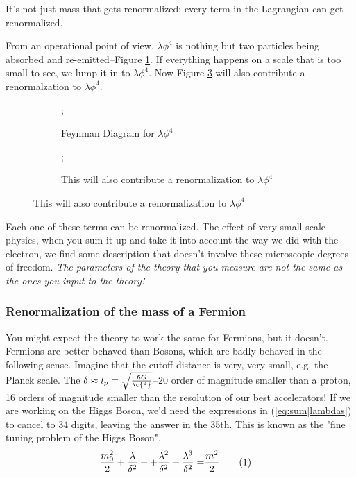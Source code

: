 \documentclass[]{article}
\newcommand\numberthis{\addtocounter{equation}{1}\tag{\theequation}}
\begin{document}
It's not just mass that gets renormalized: every term in the Lagrangian can get renormalized.

From an operational point of view, $\lambda \phi^4$ is nothing but two particles being absorbed and re-emitted--Figure \ref{fig:lambda:phi:4}. If everything happens on a scale that is too small to see, we lump it in to $\lambda \phi^4$. Now Figure \ref{fig:lambda:phi:4x} will also contribute a renormalzation to $\lambda \phi^4$.

\begin{figure}[H]
	\begin{center}
		\caption{Renormalization of $\lambda \phi^4$}
		\begin{subfigure}[t]{0.45\textwidth}
			\caption{Feynman Diagram for $\lambda \phi^4$}\label{fig:lambda:phi:4}
			;
		\end{subfigure}
		\begin{subfigure}[t]{0.45\textwidth}
			\begin{center}
				\caption{This will also contribute a renormalization to $\lambda \phi^4$}\label{fig:lambda:phi:4x}
				;
			\end{center}
		\end{subfigure}
	\end{center}
\end{figure}

Each one of these terms can be renormalized. The effect of very small scale physics, when you sum it up and take it into account the way we did with the electron, we find some description that doesn't involve these microscopic degrees of freedom. \emph{The parameters of the theory that you measure are not the same as the ones you input to the theory!}

\subsubsection{Renormalization of the mass of a Fermion}


You might expect the theory to work the same for Fermions, but it doesn't. Fermions are better behaved than Bosons, which are badly behaved in the following sense. Imagine that the cutoff distance is very, very small, e.g. the Planck scale. The $\delta \approx l_p = \sqrt{\frac{\hslash G}{\c{^3}}}$--20 order of magnitude smaller than a proton, 16 orders of magnitude smaller than the resolution of our best accelerators! If we are working on the Higgs Boson, we'd need the expressions in (\ref{eq:sum|lambdas}) to cancel to 34 digits, leaving the answer in the 35th. This is known as the "fine tuning problem of the Higgs Boson".
\begin{align*}
	\frac{m_0^2}{2} + \frac{\lambda}{\delta^2} +  + \frac{\lambda^2}{\delta^2}  + \frac{\lambda^3}{\delta^2} =& \frac{m^2}{2}\numberthis\label{eq:sum|lambdas}
\end{align*}
\end{document}
